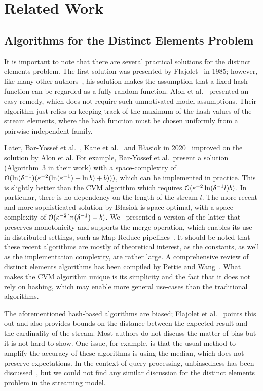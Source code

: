 \section{Related Work}\label{sec:related_work}
\subsection{Algorithms for the Distinct Elements Problem}
It is important to note that there are several practical solutions for the distinct elements problem.
The first solution was presented by Flajolet~\cite{flajolet1985} in 1985; however, like many other authors~\cite{flajolet2007,heule2013}, his solution makes the assumption that a fixed hash function can be regarded as a fully random function.
Alon et al.~\cite[Section 2.3]{alon1999} presented an easy remedy, which does not require such unmotivated model assumptions.
Their algorithm just relies on keeping track of the maximum of the hash values of the stream elements, where the hash function must be chosen uniformly from a pairwise independent family.

Later, Bar-Yossef et al.~\cite{baryossef2002}, Kane et al.~\cite{kane2010} and B\l{}asiok in 2020~\cite{blasiok2020} improved on the solution by Alon et al.
For example, Bar-Yossef et al.\ present a solution (Algorithm~3 in their work) with a space-complexity of $\operatorname{\mathcal O}(\ln (\delta^{-1}) (\varepsilon^{-2}(\ln(\varepsilon^{-1})+\ln b) + b)))$, which can be implemented in practice.
This is slightly better than the CVM algorithm which requires $\operatorname{\mathcal O}(\varepsilon^{-2} \ln (\delta^{-1}l) b)$. In particular, there is no dependency on the length of the stream $l$.
The more recent and more sophisticated solution by B\l{}asiok is space-optimal, with a space complexity of $\operatorname{\mathcal O}(\varepsilon^{-2} \ln (\delta^{-1}) + b)$.
We~\cite{karayel2023} presented a version of the latter that preserves monotonicity and supports the merge-operation, which enables its use in distributed settings, such as Map-Reduce pipelines~\cite{dean2010}.
It should be noted that these recent algorithms are mostly of theoretical interest, as the constants, as well as the implementation complexity, are rather large.
A comprehensive review of distinct elements algorithms has been compiled by Pettie and Wang~\cite[Table~1]{pettie2021}.
What makes the CVM algorithm unique is its simplicity and the fact that it does not rely on hashing, which may enable more general use-cases than the traditional algorithms.

The aforementioned hash-based algorithms are biased; Flajolet et al.~\cite{flajolet1985} points this out and also provides bounds on the distance between the expected result and the cardinality of the stream.
Most authors do not discuss the matter of bias but it is not hard to show.
One issue, for example, is that the usual method to amplify the accuracy of these algorithms is using the median, which does not preserve expectations.
In the context of query processing, unbiasedness has been discussed~\cite[Section 2.1]{haas1995}, but we could not find any similar discussion for the distinct elements problem in the streaming model.

